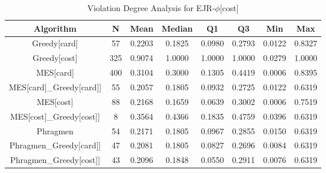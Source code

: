 

\begin{table}[h]
\centering
\begin{tabular}{cccccccc}
\toprule
Algorithm & N & Mean & Median & Q1 & Q3 & Min & Max \\
\midrule
Greedy[card] & 57 & 0.2203 & 0.1825 & 0.0980 & 0.2793 & 0.0122 & 0.8327 \\
Greedy[cost] & 325 & 0.9074 & 1.0000 & 1.0000 & 1.0000 & 0.0279 & 1.0000 \\
MES[card] & 400 & 0.3104 & 0.3000 & 0.1305 & 0.4419 & 0.0006 & 0.8395 \\
MES[card]\_Greedy[card]] & 55 & 0.2057 & 0.1805 & 0.0932 & 0.2725 & 0.0122 & 0.6319 \\
MES[cost] & 88 & 0.2168 & 0.1659 & 0.0639 & 0.3002 & 0.0006 & 0.7519 \\
MES[cost]\_Greedy[cost]] & 8 & 0.3564 & 0.4366 & 0.1835 & 0.4759 & 0.0396 & 0.6319 \\
Phragmen & 54 & 0.2171 & 0.1805 & 0.0967 & 0.2855 & 0.0150 & 0.6319 \\
Phragmen\_Greedy[card]] & 47 & 0.2081 & 0.1805 & 0.0827 & 0.2696 & 0.0084 & 0.6319 \\
Phragmen\_Greedy[cost]] & 43 & 0.2096 & 0.1848 & 0.0550 & 0.2911 & 0.0076 & 0.6319 \\
\bottomrule
\end{tabular}
\caption{Violation Degree Analysis for EJR-$\phi$[cost]}
\label{tab:analyze_ejr_violations_by_utility_0}
\end{table}

